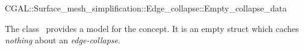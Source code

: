 

\begin{ccRefClass}{CGAL::Surface_mesh_simplification::Edge_collapse::Empty_collapse_data}


\ccDefinition

The class \ccRefName\ provides a model for the  concept.
It is an empty struct which caches {\em nothing} about an {\em edge-collapse}.


\ccIsModel
{}

\ccSeeAlso
{}\\
\\
\\
\\
\\

\end{ccRefClass}


